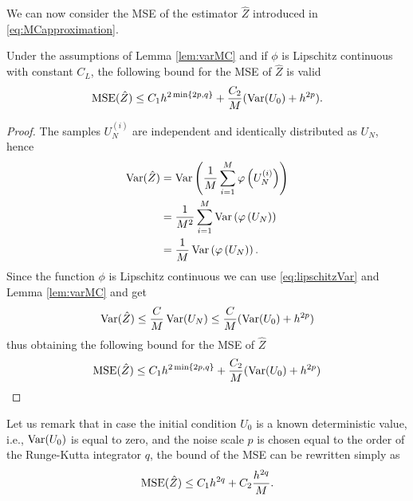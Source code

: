 \noindent We can now consider the MSE of the estimator $\hat Z$ introduced in \eqref{eq:MCapproximation}.
\begin{theorem}\label{prop:MSE} Under the assumptions of Lemma \ref{lem:varMC} and if $\phi$ is Lipschitz continuous with constant $C_L$, the following bound for the MSE of $\hat Z$ is valid
\begin{equation}
\operatorname{MSE}(\hat Z) \leq C_1 h^{2\min\{2p, q\}} + \frac{C_2}{M} (\operatorname{Var}(U_0) + h^{2p}).
\end{equation}	
\end{theorem}
\begin{proof} The samples $U_N^{(i)}$ are independent and identically distributed as $U_N$, hence
\begin{equation}
\begin{aligned}
	\operatorname{Var}(\hat Z) &= \operatorname{Var}\left(\frac{1}{M} \sum_{i = 1}^M \varphi\left(U_N^{(i)}\right)\right) \\
	&= \frac{1}{M^2} \sum_{i = 1}^M \operatorname{Var}\left(\varphi\left(U_N\right)\right) \\
	&= \frac{1}{M} \operatorname{Var}\left(\varphi\left(U_N\right)\right). \\
\end{aligned}
\end{equation}
Since the function $\phi$ is Lipschitz continuous we can use \eqref{eq:lipschitzVar} and Lemma \ref{lem:varMC} and get
\begin{equation}
\operatorname{Var}(\hat Z) \leq \frac{C}{M} \operatorname{Var}(U_N) \leq \frac{C}{M} (\operatorname{Var}(U_0) + h^{2p})
\end{equation}
thus obtaining the following bound for the MSE of $\hat Z$ 
\begin{equation}
	\operatorname{MSE}(\hat Z) \leq C_1 h^{2\min\{2p, q\}} + \frac{C_2}{M} (\operatorname{Var}(U_0) + h^{2p})
\end{equation}
\end{proof}
\begin{remark}
Let us remark that in case the initial condition $U_0$ is a known deterministic value, i.e., $\operatorname{Var}(U_0)$ is equal to zero, and the noise scale $p$ is chosen equal to the order of the Runge-Kutta integrator $q$, the bound of the MSE can be rewritten simply as 
\begin{equation}
	\operatorname{MSE}(\hat Z) \leq C_1 h^{2q} + C_2 \frac{h^{2q}}{M}.
\end{equation}
\end{remark}
